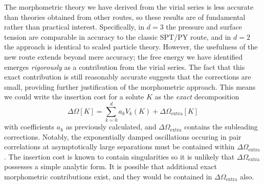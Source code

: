 \documentclass[11pt,twoside]{report}
\begin{document}
The morphometric theory we have derived from the virial series is less accurate than theories obtained from other routes, so these results are of fundamental rather than practical interest.
Specifically, in $d=3$ the pressure and surface tension are comparable in accuracy to the classic SPT/PY route, and in $d=2$ the approach is identical to scaled particle theory.
However, the usefulness of the new route extends beyond mere accuracy; the free energy we have identified emerges \emph{rigorously} as a contribution from the virial series.
The fact that this exact contribution is still reasonably accurate suggests that the corrections are small, providing further justification of the morphometric approach.
This means we could write the insertion cost for a solute $K$ as the \emph{exact} decomposition
\begin{equation}\label{eq:exact-morph-decomposition}
  \Delta \Omega[K]
  =
  \sum_{k=0}^d a_k V_k(K)
  + \Delta \Omega_\mathrm{extra}[K]
\end{equation}
with coefficients $a_k$ as previously calculated, and $\Delta \Omega_\mathrm{extra}$ contains the subleading corrections.
Notably, the exponentially damped oscillations occuring in pair correlations at asymptotically large separations must be contained within $\Delta \Omega_\mathrm{extra}$.
The insertion cost is known to contain singularities \cite{ReissJCP1959} so it is unlikely that $\Delta \Omega_\mathrm{extra}$ possesses a simple analytic form.
It is possible that additional exact morphometric contributions exist, and they would be contained in $\Delta \Omega_\mathrm{extra}$ also.
\end{document}
